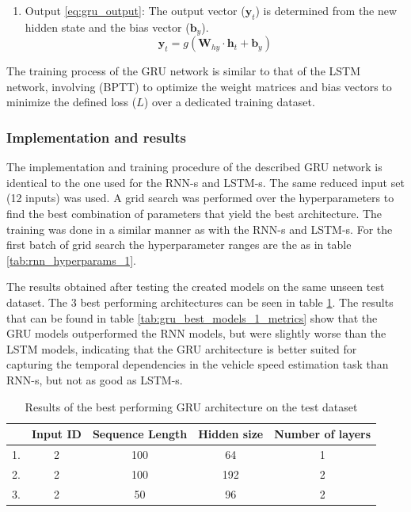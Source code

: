 \begin{enumerate}
    \begin{equation}
        \mathbf{h}_t = (1 - \mathbf{z}_t) \odot \mathbf{h}_{t-1} + \mathbf{z}_t \odot \tilde{\mathbf{h}}_t
        \label{eq:gru_new_hidden_state}
    \end{equation}
    \item Output \ref{eq:gru_output}: The output vector ($\mathbf{y}_t$) is determined from the new hidden state and the bias vector ($\mathbf{b}_y$).
    \begin{equation}
        \mathbf{y}_t = g(\mathbf{W}_{hy} \cdot \mathbf{h}_t + \mathbf{b}_y)
        \label{eq:gru_output}
    \end{equation}
\end{enumerate}

The training process of the GRU network is similar to that of the LSTM network, involving (BPTT) to optimize the weight matrices and bias vectors to minimize the defined loss ($L$) over a dedicated training dataset.

\subsubsection{Implementation and results}

The implementation and training procedure of the described GRU network is identical to the one used for the RNN-s and LSTM-s. The same reduced input set (12 inputs) was used. A grid search was performed over the hyperparameters to find the best combination of parameters that yield the best architecture. The training was done in a similar manner as with the RNN-s and LSTM-s. For the first batch of grid search the hyperparameter ranges are the as in table \ref{tab:rnn_hyperparams_1}.

The results obtained after testing the created models on the same unseen test dataset. The 3 best performing architectures can be seen in table \ref{tab:gru_best_models_1}. The results that can be found in table \ref{tab:gru_best_models_1_metrics} show that the GRU models outperformed the RNN models, but were slightly worse than the LSTM models, indicating that the GRU architecture is better suited for capturing the temporal dependencies in the vehicle speed estimation task than RNN-s, but not as good as LSTM-s.

\FloatBarrier
\begin{table}[h]
    \centering
    \begin{tabular}{|c|c|c|c|c|}
        \hline
          & \textbf{Input ID} & \textbf{Sequence Length} & \textbf{Hidden size} & \textbf{Number of layers} \\
        \hline \hline
        1. & 2 & 100 & 64 & 1 \\
        \hline
        2. & 2 & 100 & 192 & 2 \\
        \hline
        3. & 2 & 50 & 96 & 2 \\
        \hline
    \end{tabular}
    \caption{Results of the best performing GRU architecture on the test dataset}
    \label{tab:gru_best_models_1}
\end{table}
\FloatBarrier

